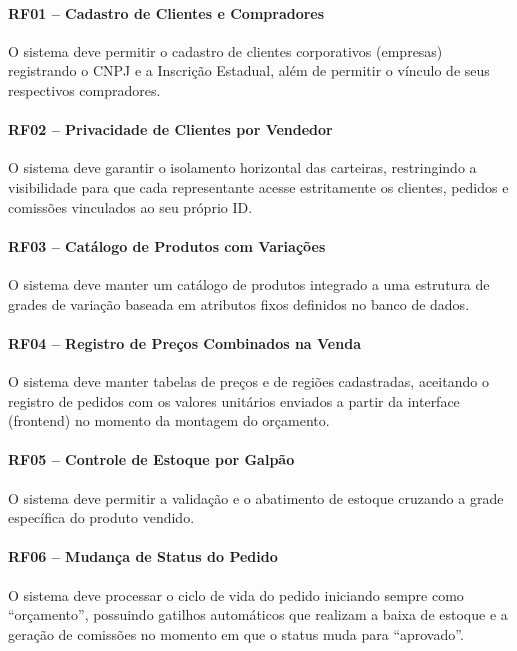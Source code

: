 \documentclass[12pt,a4paper]{article}
\begin{document}
\paragraph*{RF01 -- Cadastro de Clientes e Compradores}
O sistema deve permitir o cadastro de clientes corporativos (empresas) registrando o CNPJ e a Inscrição Estadual, além de permitir o vínculo de seus respectivos compradores.

\paragraph*{RF02 -- Privacidade de Clientes por Vendedor}
O sistema deve garantir o isolamento horizontal das carteiras, restringindo a visibilidade para que cada representante acesse estritamente os clientes, pedidos e comissões vinculados ao seu próprio ID.

\paragraph*{RF03 -- Catálogo de Produtos com Variações}
O sistema deve manter um catálogo de produtos integrado a uma estrutura de grades de variação baseada em atributos fixos definidos no banco de dados.

\paragraph*{RF04 -- Registro de Preços Combinados na Venda}
O sistema deve manter tabelas de preços e de regiões cadastradas, aceitando o registro de pedidos com os valores unitários enviados a partir da interface (frontend) no momento da montagem do orçamento.

\paragraph*{RF05 -- Controle de Estoque por Galpão}
O sistema deve permitir a validação e o abatimento de estoque cruzando a grade específica do produto vendido.

\paragraph*{RF06 -- Mudança de Status do Pedido}
O sistema deve processar o ciclo de vida do pedido iniciando sempre como ``orçamento'', possuindo gatilhos automáticos que realizam a baixa de estoque e a geração de comissões no momento em que o status muda para ``aprovado''.
\end{document}
